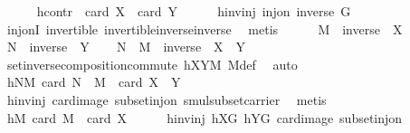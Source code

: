 \begin{isabellebody}
\ \ \ \ \isamarkupfalse%
\ hcontr{\isacharcolon}{\kern0pt}\ {\isachardoublequoteopen}{\isasymnot}\ card\ X\ {\isasymle}\ card\ Y{\isachardoublequoteclose}\isanewline
\ \ \ \ \isamarkupfalse%
\ hinvinj{\isacharcolon}{\kern0pt}\ {\isachardoublequoteopen}inj{\isacharunderscore}{\kern0pt}on\ inverse\ G{\isachardoublequoteclose}\ \isamarkupfalse%
\ inj{\isacharunderscore}{\kern0pt}onI\ invertible\ invertible{\isacharunderscore}{\kern0pt}inverse{\isacharunderscore}{\kern0pt}inverse\ \isamarkupfalse%
\ metis\isanewline
\ \ \ \ \isamarkupfalse%
\ {\isacharquery}{\kern0pt}M\ {\isacharequal}{\kern0pt}\ {\isachardoublequoteopen}inverse\ {\isacharbackquote}{\kern0pt}\ X{\isachardoublequoteclose}\isanewline
\ \ \ \ \isamarkupfalse%
\ {\isacharquery}{\kern0pt}N\ {\isacharequal}{\kern0pt}\ {\isachardoublequoteopen}inverse\ {\isacharbackquote}{\kern0pt}\ Y{\isachardoublequoteclose}\isanewline
\ \ \isamarkupfalse%
\ {\isachardoublequoteopen}{\isacharquery}{\kern0pt}N\ {\isasymcdots}\ {\isacharquery}{\kern0pt}M\ {\isacharequal}{\kern0pt}\ inverse\ {\isacharbackquote}{\kern0pt}\ {\isacharparenleft}{\kern0pt}X\ {\isasymcdots}\ Y{\isacharparenright}{\kern0pt}{\isachardoublequoteclose}\ \isamarkupfalse%
\ set{\isacharunderscore}{\kern0pt}inverse{\isacharunderscore}{\kern0pt}composition{\isacharunderscore}{\kern0pt}commute\ hXYM\ M{\isacharunderscore}{\kern0pt}def\ \isamarkupfalse%
\ auto\isanewline
\ \ \isamarkupfalse%
\ \isamarkupfalse%
\ hNM{\isacharcolon}{\kern0pt}\ {\isachardoublequoteopen}card\ {\isacharparenleft}{\kern0pt}{\isacharquery}{\kern0pt}N\ {\isasymcdots}\ {\isacharquery}{\kern0pt}M{\isacharparenright}{\kern0pt}\ {\isacharequal}{\kern0pt}\ card\ {\isacharparenleft}{\kern0pt}X\ {\isasymcdots}\ Y{\isacharparenright}{\kern0pt}{\isachardoublequoteclose}\ \isanewline
\ \ \ \ \isamarkupfalse%
\ hinvinj\ card{\isacharunderscore}{\kern0pt}image\ subset{\isacharunderscore}{\kern0pt}inj{\isacharunderscore}{\kern0pt}on\ smul{\isacharunderscore}{\kern0pt}subset{\isacharunderscore}{\kern0pt}carrier\ \isamarkupfalse%
\ metis\isanewline
\ \ \isamarkupfalse%
\ \isamarkupfalse%
\ hM{\isacharcolon}{\kern0pt}\ {\isachardoublequoteopen}card\ {\isacharquery}{\kern0pt}M\ {\isacharequal}{\kern0pt}\ card\ X{\isachardoublequoteclose}\isanewline
\ \ \ \ \isamarkupfalse%
\ hinvinj\ hXG\ hYG\ card{\isacharunderscore}{\kern0pt}image\ subset{\isacharunderscore}{\kern0pt}inj{\isacharunderscore}{\kern0pt}on\ \isamarkupfalse%

\end{isabellebody}
